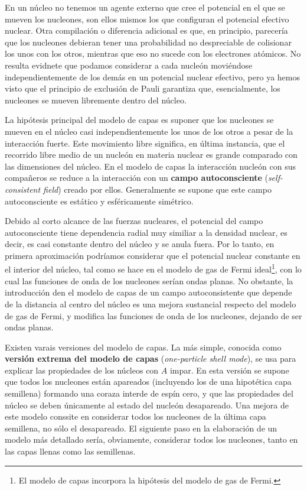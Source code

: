 En un núcleo no tenemos un agente externo que cree el potencial en el que se mueven los nucleones, son ellos mismos los que configuran el potencial efectivo nuclear. Otra compilación o diferencia adicional es que, en principio, parecería que los nucleones debieran tener una probabilidad no despreciable de colisionar los unos con los otros, mientras que eso no sucede con los electrones atómicos. No resulta evidnete que podamos considerar a cada nucleón moviéndose independientemente de los demás en un potencial nuclear efectivo, pero ya hemos visto que el principio de exclusión de Pauli garantiza que, esencialmente, los nucleones se mueven libremente dentro del núcleo. 

La hipótesis principal del modelo de capas es suponer que los nucleones se mueven en el núcleo casi independientemente los unos de los otros a pesar de la interacción fuerte. Este movimiento libre significa, en última instancia, que el recorrido libre medio de un nucleón en materia nuclear es grande comparado con las dimensiones del núcleo. En el modelo de capas la interacción nucleón con sus compañeros se reduce a la interacción con un \textbf{campo autoconsciente} (\textit{self-consistent field}) creado por ellos. Generalmente se supone que este campo autoconsciente es estático y esféricamente simétrico.

Debido al corto alcance de las fuerzas nucleares, el potencial del campo autoconsciente tiene dependencia radial muy similiar a la densidad nuclear, es decir, es casi constante dentro del núcleo y se anula fuera. Por lo tanto, en primera aproximación podríamos considerar que el potencial nuclear constante en el interior del núcleo, tal como se hace en el modelo de gas de Fermi ideal\footnote{El modelo de capas incorpora la hipótesis del modelo de gas de Fermi.}, con lo cual las funciones de onda de los nucleones serían ondas planas. No obstante, la introducción den el modelo de capas de un campo autoconsistente que depende de la distancia al centro del núcleo es una mejora sustancial respecto del modelo de gas de Fermi, y modifica las funciones de onda de los nucleones, dejando de ser ondas planas. 

Existen varais versiones del modelo de capas. La más simple, conocida como \textbf{versión extrema del modelo de capas} (\textit{one-particle shell mode}), se usa para explicar las propiedades de los núcleos con $A$ impar. En esta versión se supone que todos los nucleones están apareados (incluyendo los de una hipotética capa semillena) formando una coraza interde de espín cero, y que las propiedades del núcleo se deben únicamente al estado del nucleón desapareado. Una mejora de este modelo conssite en considerar todos los nucleones de la última capa semillena, no sólo el desapareado. El siguiente paso en la elaboración de un modelo más detallado sería, obviamente, considerar todos los nucleones, tanto en las capas llenas como las semillenas.

